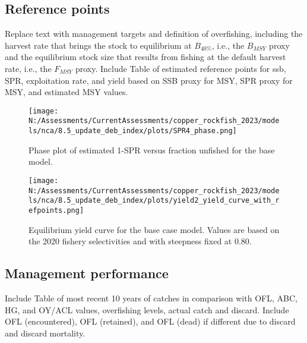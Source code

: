 \documentclass[11pt,
  english,
  letterpaper,
]{article}
\begin{document}
\hypertarget{reference-points}{%
\subsection*{Reference points}\label{reference-points}}

Replace text with management targets and definition of overfishing, including the harvest rate that brings the stock to equilibrium at \(B_{40\%}\), i.e., the \(B_{MSY}\) proxy and the equilibrium stock size that results from fishing at the default harvest rate, i.e., the \(F_{MSY}\) proxy. Include Table of estimated reference points for ssb, SPR, exploitation rate, and yield based on SSB proxy for MSY, SPR proxy for MSY, and estimated MSY values.

\begin{figure}
\centering
\texttt{[image: N:/Assessments/CurrentAssessments/copper\_rockfish\_2023/models/nca/8.5\_update\_deb\_index/plots/SPR4\_phase.png]}
\caption{Phase plot of estimated 1-SPR versus fraction unfished for the base model.\label{fig:es-phase}}
\end{figure}

\begin{figure}
\centering
\texttt{[image: N:/Assessments/CurrentAssessments/copper\_rockfish\_2023/models/nca/8.5\_update\_deb\_index/plots/yield2\_yield\_curve\_with\_refpoints.png]}
\caption{Equilibrium yield curve for the base case model. Values are based on the 2020 fishery selectivities and with steepness fixed at 0.80.\label{fig:es-yield}}
\end{figure}

\hypertarget{management-performance}{%
\subsection*{Management performance}\label{management-performance}}

Include Table of most recent 10 years of catches in comparison with OFL, ABC, HG, and OY/ACL values, overfishing levels, actual catch and discard. Include OFL (encountered), OFL (retained), and OFL (dead) if different due to discard and discard mortality.

\begingroup\fontsize{10}{12}\selectfont
\begingroup\fontsize{10}{12}\selectfont
\end{document}
